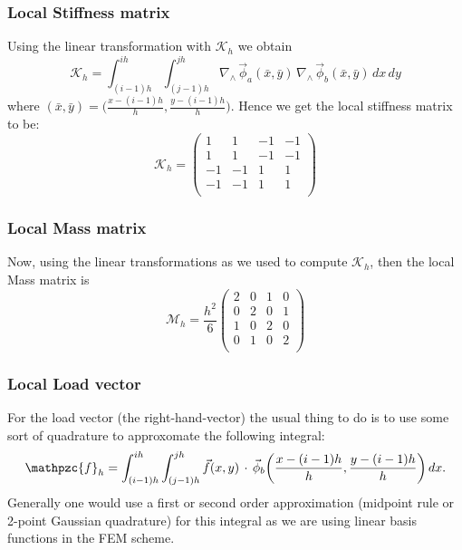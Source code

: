 \documentclass[14pt]{extarticle}
\numberwithin{equation}{section}    %
\newcommand{\curl}{\ensuremath{\nabla_{\wedge}\,}}
\newcommand{\f}{\vec f}
\newcommand{\phiv}{\vec \phi}
\begin{document}
\subsubsection{Local Stiffness matrix}
Using the linear transformation with $\mathcal{K}_h$ we obtain
$$ \mathcal{K}_h =  \int_{(i-1)h}^{ih}\int_{(j-1)h}^{jh} \curl \phiv_a(\bar x,\bar y) \, \curl \phiv_b (\bar x,\bar y) \, dx \, dy $$
where $(\bar x, \bar y) = \big(\frac{x-(i-1)h}{h},\frac{y-(i-1)h}{h}\big)$. Hence we get the local stiffness matrix to be:
\begin{equation}
    \mathcal{K}_h = \begin{pmatrix}
        1&1&-1&-1\\1&1&-1&-1\\-1&-1&1&1\\-1&-1&1&1\\
    \end{pmatrix}
\end{equation}


\subsubsection{Local Mass matrix}

Now, using the linear transformations as we used to compute $\mathcal{K}_h$, then the local Mass matrix is
\begin{equation}
    \mathcal{M}_h = \frac {h^2}{6} \begin{pmatrix}
         2 & 0 & 1 & 0\\ 0 & 2 & 0 & 1\\ 1 & 0 & 2 & 0\\ 0 & 1 & 0 & 2\\
    \end{pmatrix}
\end{equation}

\subsubsection{Local Load vector}
For the load vector (the right-hand-vector) the usual thing to do is to use some sort of quadrature to approxomate the following integral:
$$  \mathpzc{f}_h =\int_{(i-1)h}^{ih}\int_{(j-1)h}^{jh} \f (x,y) \, \cdot \, \phiv_b  \bigg(\frac{x-(i-1)h}{h},\frac{y-(i-1)h}{h}\bigg)\, dx. $$
Generally one would use a first or second order approximation (midpoint rule or 2-point Gaussian quadrature) for this integral as we are using linear basis functions in the FEM scheme.
\end{document}
